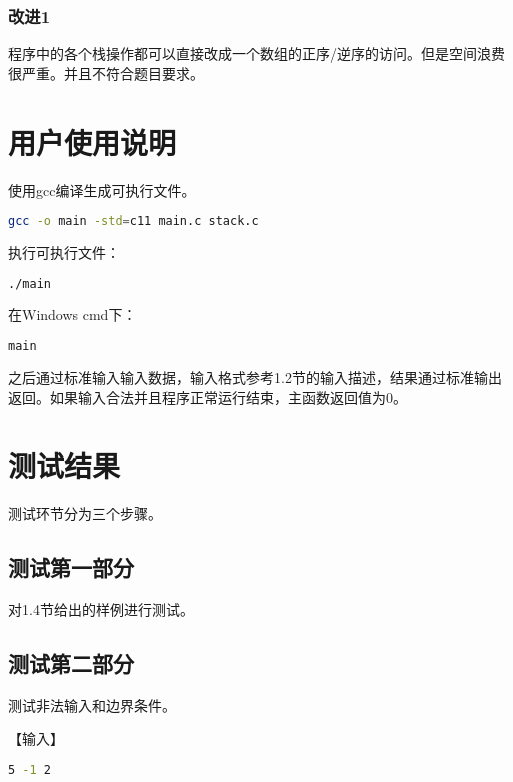 \documentclass{article}
\begin{document}
\subsubsection{改进1}

程序中的各个栈操作都可以直接改成一个数组的正序/逆序的访问。但是空间浪费很严重。并且不符合题目要求。

\section{用户使用说明}

使用gcc编译生成可执行文件。

\begin{lstlisting}[language={bash},
    basicstyle=\small\consolas]
gcc -o main -std=c11 main.c stack.c
\end{lstlisting}

执行可执行文件：

\begin{lstlisting}[language={bash},
    basicstyle=\small\consolas]
./main
\end{lstlisting}

在Windows cmd下：

\begin{lstlisting}[language={bash},
    basicstyle=\small\consolas]
main
\end{lstlisting}

之后通过标准输入输入数据，输入格式参考1.2节的输入描述，结果通过标准输出返回。如果输入合法并且程序正常运行结束，主函数返回值为0。

\section{测试结果}

测试环节分为三个步骤。

\subsection{测试第一部分}

对1.4节给出的样例进行测试。

\subsection{测试第二部分}

测试非法输入和边界条件。

【输入】

\begin{lstlisting}[language={bash},
    basicstyle=\small\consolas]
5 -1 2
\end{lstlisting}
\end{document}
